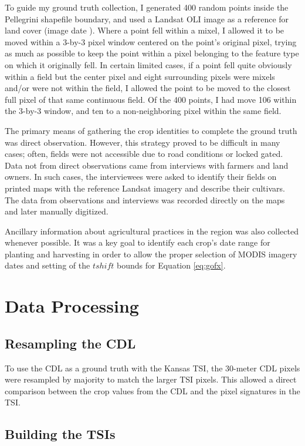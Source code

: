 To guide my ground truth collection, I generated 400 random points inside the Pellegrini shapefile boundary, and used a Landsat OLI image as a reference for land cover (image date ). Where a point fell within a mixel, I allowed it to be moved within a 3-by-3 pixel window centered on the point's original pixel, trying as much as possible to keep the point within a pixel belonging to the feature type on which it originally fell. In certain limited cases, if a point fell quite obviously within a field but the center pixel and eight surrounding pixels were mixels and/or were not within the field, I allowed the point to be moved to the closest full pixel of that same continuous field. Of the 400 points, I had move 106 within the 3-by-3 window, and ten to a non-neighboring pixel within the same field.

The primary means of gathering the crop identities to complete the ground truth was direct observation. However, this strategy proved to be difficult in many cases; often, fields were not accessible due to road conditions or locked gated. Data not from direct observations came from interviews with farmers and land owners. In such cases, the interviewees were asked to identify their fields on printed maps with the reference Landsat imagery and describe their cultivars. The data from observations and interviews was recorded directly on the maps and later manually digitized.

Ancillary information about agricultural practices in the region was also collected whenever possible. It was a key goal to identify each crop's date range for planting and harvesting in order to allow the proper selection of MODIS imagery dates and setting of the $tshift$ bounds for Equation \ref{eq:gofx}.

\section{Data Processing}

\subsection{Resampling the CDL}

To use the CDL as a ground truth with the Kansas TSI, the 30-meter CDL pixels were resampled by majority to match the larger TSI pixels. This allowed a direct comparison between the crop values from the CDL and the pixel signatures in the TSI.

\subsection{Building the TSIs}


